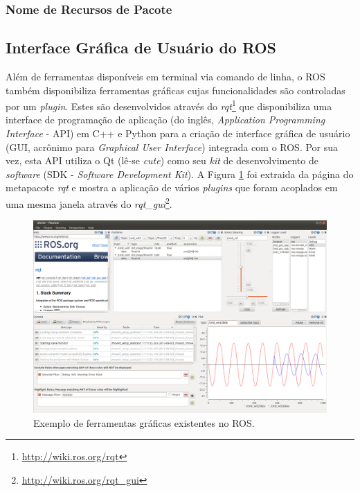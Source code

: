             \subsubsection{Nome de Recursos de Pacote} \label{subsubsec:ros_nomes_pacotes}
            
        \subsection{Interface Gráfica de Usuário do ROS}
            Além de ferramentas disponíveis em terminal via comando de linha, o ROS também disponibiliza ferramentas gráficas cujas funcionalidades são controladas por um \textit{plugin}. Estes são desenvolvidos através do \textit{rqt}\footnote{\url{http://wiki.ros.org/rqt}} que disponibiliza uma interface de programação de aplicação (do inglês, \textit{Application Programming Interface} - API) em C++ e Python para a criação de interface gráfica de usuário (GUI, acrônimo para \textit{Graphical User Interface}) integrada com o ROS. Por sua vez, esta API utiliza o Qt (lê-se \textit{cute}) como seu \textit{kit} de desenvolvimento de \textit{software} (SDK - \textit{Software Development Kit}). A Figura \ref{fig:ros_gui} foi extraida da página do metapacote \textit{rqt} e mostra a aplicação de vários \textit{plugins} que foram acoplados em uma mesma janela através do \textit{rqt\_gui}\footnote{\url{http://wiki.ros.org/rqt_gui}}.
            
            \begin{figure}[htb]
                \centering
                \includegraphics[width=\textwidth]{Figuras/2_revisao/ros_gui.png}
                \caption{Exemplo de ferramentas gráficas existentes no ROS.}
                \label{fig:ros_gui}
            \end{figure}
            

